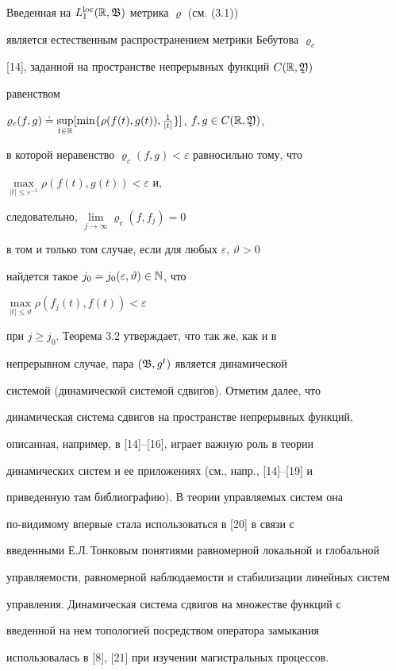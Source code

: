 \begin{notes}


Введенная на $L_1^{\operatorname{loc}}(\Bbb R,\frak B)$ метрика $\varrho$ (см. (3.1))


является естественным распространением метрики Бебутова $\varrho_c$


[14], заданной на пространстве непрерывных функций $C(\Bbb R,\frak Y)$


равенством


$\varrho_{c}(f,g)\doteq\sup\limits_{t\in\Bbb R}


[\min\{\rho(f(t),g(t)),\frac{1}{|t|}\}]$, $f,g\in C(\Bbb R,\frak Y)$,


в которой неравенство $\varrho_c(f,g)<\varepsilon$ равносильно тому, что


$\max\limits_{|t|\le\varepsilon^{-1}}\rho(f(t),g(t))<\varepsilon$ и,


следовательно, $\lim\limits_{j\to\infty}\varrho_c(f,f_{j})=0$


в том и только том случае, если для любых $\varepsilon$, $\vartheta>0$


найдется такое $j_0=j_0(\varepsilon,\vartheta)\in\Bbb N$, что


$\max\limits_{|t|\le\vartheta}\rho(f_j(t),f(t))<\varepsilon$


при $j\ge j_0$. Теорема 3.2 утверждает, что так же, как и в


непрерывном случае, пара $(\frak B,g^t)$ является динамической


системой (динамической системой сдвигов). Отметим далее, что


динамическая система сдвигов на пространстве непрерывных функций,


описанная, например, в [14]--[16], играет важную роль в теории


динамических систем и ее приложениях (см., напр., [14]--[19] и


приведенную там библиографию). В теории управляемых систем она


по-видимому впервые стала использоваться в [20] в связи с


введенными Е.Л.\,Тонковым понятиями равномерной локальной и глобальной


управляемости, равномерной наблюдаемости и стабилизации линейных систем


управления. Динамическая система сдвигов на множестве функций с


введенной на нем топологией посредством оператора замыкания


использовалась в [8], [21] при изучении магистральных процессов.


\end{notes}





